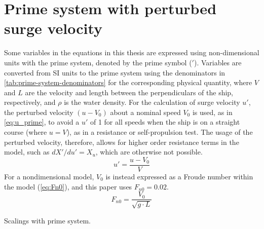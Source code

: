 \section{Prime system with perturbed surge velocity} \label{sec:prime_system}
Some variables in the equations in this thesis are expressed using non-dimensional units with the prime system, denoted by the prime symbol ($'$). Variables are converted from SI units to the prime system using the denominators in \autoref{tab:prime-system-denominators} for the corresponding physical quantity, where $V$ and $L$ are the velocity and length between the perpendiculars of the ship, respectively, and $\rho$ is the water density.
For the calculation of surge velocity $u'$, the perturbed velocity $(u-V_0)$ about a nominal speed $V_0$ is used, as in \autoref{eq:u_prime}, to avoid a $u'$ of 1 for all speeds when the ship is on a straight course (where $u=V$), as in a resistance or self-propulsion test. The usage of the perturbed velocity, therefore, allows for higher order resistance terms in the model, such as ${{dX}'/du}' = X_{u}$, which are otherwise not possible. 
\begin{equation}
    \label{eq:u_prime}
    u' = \frac{u-V_0}{V}
\end{equation}
For a nondimensional model, $V_0$ is instead expressed as a Froude number within the model (\autoref{eq:Fn0}), and this paper uses $F_{n0}=0.02$.
\begin{equation}
    \label{eq:Fn0}
    F_{n0} = \frac{V_0}{\sqrt{g \cdot L}}
\end{equation}
\begin{table}[h]
    \centering
    \caption{Scalings with prime system.}
    \label{tab:prime-system-denominators}
\end{table}